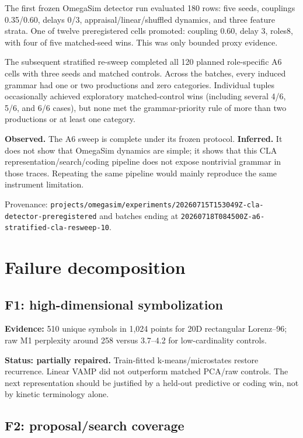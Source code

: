 \documentclass[10pt]{article}
\newcommand{\obs}{\textbf{Observed.}}
\newcommand{\inferd}{\textbf{Inferred.}}
\begin{document}
The first frozen OmegaSim detector run evaluated 180 rows: five seeds,
couplings 0.35/0.60, delays 0/3, appraisal/linear/shuffled dynamics, and three
feature strata. One of twelve preregistered cells promoted:
coupling 0.60, delay 3, roles8, with four of five matched-seed wins. This was
only bounded proxy evidence.

The subsequent stratified re-sweep completed all 120 planned role-specific A6
cells with three seeds and matched controls. Across the batches, every induced
grammar had one or two productions and zero categories. Individual tuples
occasionally achieved exploratory matched-control wins (including several
4/6, 5/6, and 6/6 cases), but none met the grammar-priority rule of more than
two productions or at least one category.

\obs{} The A6 sweep is complete under its frozen protocol. \inferd{} It does not
show that OmegaSim dynamics are simple; it shows that this CLA
representation/search/coding pipeline does not expose nontrivial grammar in
those traces. Repeating the same pipeline would mainly reproduce the same
instrument limitation.

Provenance:
\texttt{projects/omegasim/experiments/20260715T153049Z-cla-detector-preregistered}
and batches ending at
\texttt{20260718T084500Z-a6-stratified-cla-resweep-10}.

\section{Failure decomposition}

\subsection{F1: high-dimensional symbolization}

\textbf{Evidence:} 510 unique symbols in 1,024 points for 20D rectangular
Lorenz--96; raw M1 perplexity around 258 versus 3.7--4.2 for
low-cardinality controls.

\textbf{Status: partially repaired.} Train-fitted k-means/microstates restore
recurrence. Linear VAMP did not outperform matched PCA/raw controls. The next
representation should be justified by a held-out predictive or coding win, not
by kinetic terminology alone.

\subsection{F2: proposal/search coverage}
\end{document}

